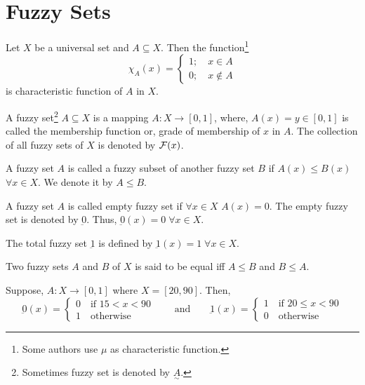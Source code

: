 \documentclass[../main-sheet.tex]{subfiles}
\begin{document}
\chapter{Fuzzy Sets}
\begin{defn}
    Let \(X\) be a universal set and \(A\subseteq X\). Then the function\footnote{Some authors use \(\mu\) as characteristic function.}
    \[\chi_A(x)=\begin{cases}
        1;\quad x\in A\\
        0;\quad x\notin A
    \end{cases}\]
    is characteristic function of \(A\) in \(X\).
\end{defn}


\begin{defn}
    A fuzzy set\footnote{Sometimes fuzzy set is denoted by \(\underset{\sim}{A}\).} \(A\subseteq X\) is a mapping \(A:X\to[0,1]\), where, \(A(x)=y\in [0,1]\) is called the membership function or, grade of membership of \(x\) in \(A\). The collection of all fuzzy sets of \(X\) is denoted by \(\mathcal{F}(x)\).
\end{defn}
\begin{defn}
    A fuzzy set \(A\) is called a fuzzy subset of another fuzzy set \(B\) if \(A(x)\leq B(x)\) \(\forall x\in X\). We denote it by \(A\leq B\).
\end{defn}
\begin{defn}
    A fuzzy set \(A \) is called empty fuzzy set if \(\forall x\in X\) \(A(x)=0\). The empty fuzzy set is denoted by \(\underbar{0}\). Thus, \(\underbar{0}(x)=0\; \forall x\in  X\).
\end{defn}
\begin{defn} The total fuzzy set \(\underbar{1}\) is defined by  \(\underbar{1}(x)=1\; \forall x\in  X\).
\end{defn}
\begin{defn}
    Two fuzzy sets \(A\) and \(B\) of \(X\) is said to be equal iff \(A\leq B\) and \(B\leq A\).
\end{defn}
\begin{ex}
    Suppose, \(A:X\to[0,1]\) where \(X=[20,90]\). Then,
    \[
        \underbar{0}(x)=\begin{cases}
        0\quad \text{if } 15<x<90\\
        1\quad \text{otherwise }
    \end{cases}\qquad\text{and}\qquad
        \underbar{1}(x)=\begin{cases}
        1\quad \text{if } 20\leq x<90\\
        0\quad \text{otherwise }
    \end{cases}
    \]
\end{ex}
\end{document}
